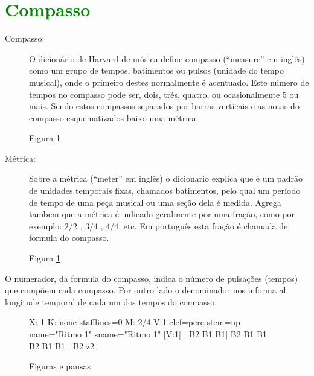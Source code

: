 \section{\textcolor{green}{Compasso}}
\label{sec:compaso}

\begin{description}
\item[Compasso:] O dicionário de Harvard de música \cite[pp. 513]{apel1969harvard} define compasso (``measure'' em inglês)
como um grupo de tempos, batimentos ou pulsos (unidade do tempo musical),
onde o primeiro destes normalmente é acentuado. 
Este número de tempos no compasso pode ser, dois, trés, quatro, ou ocasionalmente 5 ou mais. 
Sendo estos compassos separados por barras verticais e as notas do compasso esquematizados baixo uma métrica.
\begin{example}
Figura \ref{fig:abc-exemplocompasso1}
\end{example}
 
\item[Métrica:] Sobre a métrica  (``meter'' em inglês) o dicionario \cite[pp. 523]{apel1969harvard} explica que é
um padrão de unidades temporais fixas, chamados batimentos, 
pelo qual um período de tempo de uma peça musical ou uma seção dela é medida. 
Agrega tambem que a métrica é indicado geralmente por uma fração, como por exemplo:
${2}/{2}$ , ${3}/{4}$ , ${4}/{4}$, etc. Em português esta fração é chamada de formula do compasso. 
\begin{example}
Figura \ref{fig:abc-exemplocompasso1}
\end{example}
\end{description}

O numerador, da formula do compasso, indica o número de pulsações (tempos) que compõem cada compasso.
Por outro lado o denominador nos informa al longitude temporal de cada um dos tempos do compasso.

\begin{figure}[h]
\centering
\begin{abc}[name=abc-exemplocompasso1]
%
X: 1 %
K: none stafflines=0 %
M: 2/4
V:1 clef=perc stem=up name="Ritmo 1"   sname="Ritmo 1"
%
[V:1] | B2 B1 B1| B2 B1 B1 | B2 B1 B1 | B2 z2  |
%       
\end{abc}
\caption{Figuras e pausas}
\label{fig:abc-exemplocompasso1}
\end{figure}



